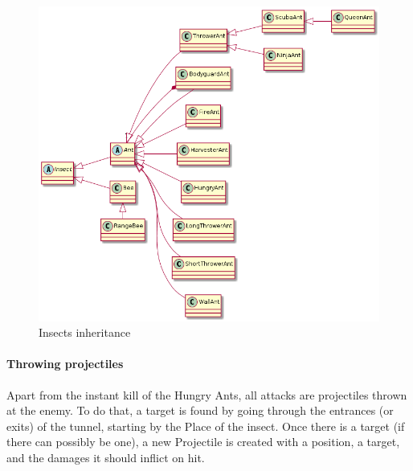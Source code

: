 \documentclass[
	a4paper
]{article}
\begin{document}
\begin{figure}[H]
	\includegraphics[scale=0.55]{insectsDiagram.png}
	\caption{Insects inheritance}
	\label{insectsDiagram}
\end{figure}

\paragraph{Throwing projectiles} Apart from the instant kill of the Hungry Ants, all attacks are projectiles thrown at the enemy. %
To do that, a target is found by going through the entrances (or exits) of the tunnel, starting by the Place of the insect. %
Once there is a target (if there can possibly be one), a new Projectile is created with a position, a target, and the damages it should inflict on hit.
\end{document}
